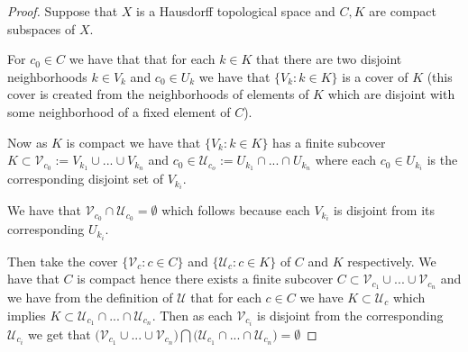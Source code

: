 \documentclass{amsart}
\theoremstyle{plain}
\theoremstyle{definition}
\theoremstyle{remark}
\begin{document}
\begin{proof}
    Suppose that $X$ is a Hausdorff topological space and $C,K$ are compact subspaces of $X$. 
    
   
    For $c_0 \in C$ we have that that for each $k\in K$ that there are two disjoint neighborhoods $k\in V_k$ and $c_0\in U_k$ we have that $\{V_k:k\in K\}$ is a cover of $K$ (this cover is created from the neighborhoods of elements of $K$ which are disjoint with some neighborhood of a fixed element of $C$).
    
    Now as $K$ is compact we have that $\{V_k:k\in K\}$ has a finite subcover $K\subset \mathcal V_{c_0}:= V_{k_1}\cup ... \cup V_{k_n}$ and $c_0\in \mathcal U_{c_o}:=U_{k_1}\cap ...\cap U_{k_n}$ where each $c_0\in U_{k_i}$ is the corresponding disjoint set of $V_{k_i}$. 
    
    We have that $\mathcal V_{c_0}\cap \mathcal U_{c_0}=\emptyset$ which follows because each $V_{k_i}$ is disjoint from its corresponding $U_{k_i}$.

    Then take the cover $\{\mathcal V_c: c\in C\}$ and $\{\mathcal U_c: c\in K\}$ of $C$ and $K$ respectively. We have that $C$ is compact hence there exists a finite subcover $C\subset \mathcal V_{c_1}\cup...\cup \mathcal V_{c_n}$ and we have from the definition of $\mathcal U$ that for each $c\in C$ we have $K\subset \mathcal U_c$  which implies $K\subset \mathcal U_{c_1}\cap ...\cap \mathcal U_{c_n}$. Then as each $\mathcal V_{c_i}$ is disjoint from the corresponding $\mathcal U_{c_i}$ we get that $\big (\mathcal V_{c_1}\cup...\cup \mathcal V_{c_n} \big )\bigcap \big (\mathcal U_{c_1}\cap ...\cap \mathcal U_{c_n} \big )=\emptyset$
    




    
\end{proof}



 
\end{document}
